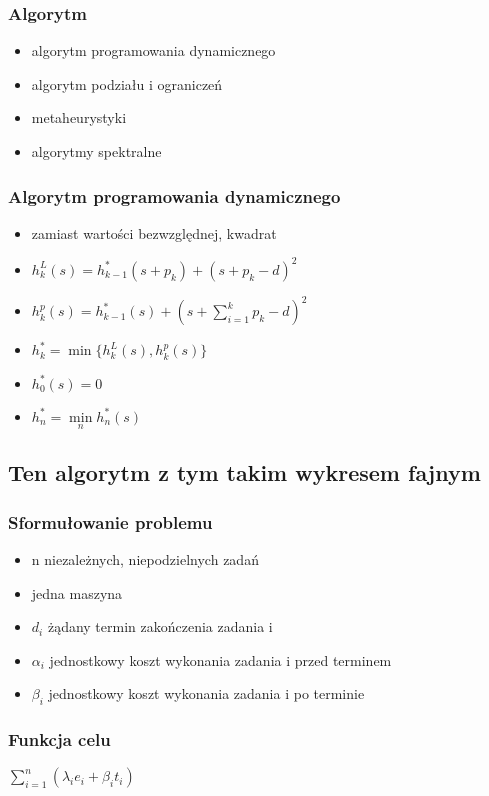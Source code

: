 \documentclass[12pt,a4paper]{article}
\begin{document}
\subsubsection{Algorytm}
\begin{itemize}
\item algorytm programowania dynamicznego
\item algorytm podziału i ograniczeń
\item metaheurystyki
\item algorytmy spektralne 
\end{itemize}
\subsubsection{Algorytm programowania dynamicznego}
\begin{itemize}
\item zamiast wartości bezwzględnej, kwadrat
\item $h_{k}^{L}(s)= h_{k-1}^{*}(s+p_{k})+(s+p_{k}-d)^2$
\item $h_{k}^{p}(s)=h_{k-1}^{*}(s)+(s+\sum\limits_{i=1}^{k}p_{k} -d)^2$
\item $h_{k}^{*}= \min\{h_{k}^{L}(s),h_{k}^{p}(s)\}$
\item $h_{0}^{*}(s)=0$
\item $h_{n}^{*}= \min\limits_{n} h_{n}^{*}(s)$
\end{itemize}
\subsection{Ten algorytm z tym takim wykresem fajnym}
\subsubsection{Sformułowanie problemu}
\begin{itemize}
\item n niezależnych, niepodzielnych zadań
\item jedna maszyna
\item $d_{i}$ żądany termin zakończenia zadania i
\item $\alpha_{i}$ jednostkowy koszt wykonania zadania i przed terminem
\item $\beta_{i}$ jednostkowy koszt wykonania zadania i po terminie
\end{itemize}
\subsubsection{Funkcja celu}
$\sum\limits_{i=1}^{n}(\lambda_{i}e_{i}+\beta_{i}t_{i})$
\end{document}
